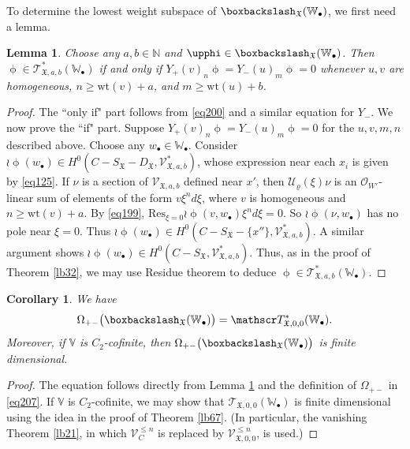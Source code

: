 \documentclass[12pt,b5paper,notitlepage]{report}
\theoremstyle{definition}
\theoremstyle{plain}
\newtheorem{co}[df]{Corollary}
\newtheorem{lm}[df]{Lemma}
\newcommand{\fk}{\mathfrak}
\newcommand{\mc}{\mathcal}
\newcommand{\Res}{\mathrm{Res}}
\newcommand{\scr}{\mathscr}
\newcommand{\SX}{S_{\fk X}}
\newcommand{\DX}{D_{\fk X}}
\newcommand{\blt}{\bullet}
\newcommand{\Vbb}{\mathbb V}
\newcommand{\Wbb}{\mathbb W}
\newcommand{\Nbb}{\mathbb N}
\newcommand{\wt}{\mathrm{wt}}
\numberwithin{equation}{section}
\begin{document}
To determine the lowest weight subspace of $\boxbackslash_{\fk X}(\Wbb_\blt)$, we first need a lemma.

\begin{lm}\label{lb103}
Choose any $a,b\in\Nbb$ and $\upphi\in\boxbackslash_{\fk X}(\Wbb_\blt)$. Then $\upphi\in\scr T_{\fk X,a,b}^*(\Wbb_\blt)$ if and only if $Y_+(v)_n\upphi=Y_-(u)_m \upphi=0$ whenever $u,v$ are homogeneous, $n\geq\wt(v)+a$, and $m\geq\wt(u)+b$.
\end{lm}




\begin{proof}
The ``only if" part follows from \eqref{eq200} and a similar equation for $Y_-$. We now prove the ``if" part. Suppose  $Y_+(v)_n\upphi=Y_-(u)_m \upphi=0$ for the $u,v,m,n$ described above. Choose any $w_\blt\in\Wbb_\blt$. Consider $\wr\upphi(w_\blt)\in H^0(C-\SX-\DX,\scr V_{\fk X,a,b}^*)$, whose expression near each $x_i$ is given by \eqref{eq125}. If $\nu$ is a section of $\scr V_{\fk X,a,b}$ defined near $x'$, then $\mc U_\varrho(\xi)\nu$ is an $\scr O_{W'}$-linear sum of elements of the form $v\xi^nd\xi$,   where $v$ is homogeneous and $n\geq\wt(v)+a$. By \eqref{eq199}, $\Res_{\xi=0}\wr\upphi(v,w_\blt)\xi^nd\xi=0$. So $\wr\upphi(\nu,w_\blt)$ has no pole near $\xi=0$. Thus $\wr\upphi(w_\blt)\in H^0(C-\SX-\{x''\},\scr V_{\fk X,a,b}^*)$. A similar argument shows $\wr\upphi(w_\blt)\in H^0(C-\SX,\scr V_{\fk X,a,b}^*)$. Thus, as in the proof of Theorem \ref{lb32}, we may use Residue theorem to deduce $\upphi\in\scr T_{\fk X,a,b}^*(\Wbb_\blt)$.
\end{proof}



\begin{co}\label{lb105}
We have
\begin{align}
\Omega_{+-}\big(\boxbackslash_{\fk X}(\Wbb_\blt)\big)=\scr T_{\fk X,0,0}^*(\Wbb_\blt).
\end{align}
Moreover, if $\Vbb$ is $C_2$-cofinite, then $\Omega_{+-}\big(\boxbackslash_{\fk X}(\Wbb_\blt)\big)$ is finite dimensional.
\end{co}





\begin{proof}
The equation follows directly from Lemma \ref{lb103} and the definition of $\Omega_{+-}$ in \eqref{eq207}. If $\Vbb$ is $C_2$-cofinite, we may show that $\scr T_{\fk X,0,0}(\Wbb_\blt)$ is finite dimensional using the idea in the proof of Theorem \ref{lb67}. (In particular, the vanishing Theorem \ref{lb21}, in which  $\scr V_C^{\leq n}$ is replaced by $\scr V_{\fk X,0,0}^{\leq n}$, is used.)
\end{proof}
\end{document}
